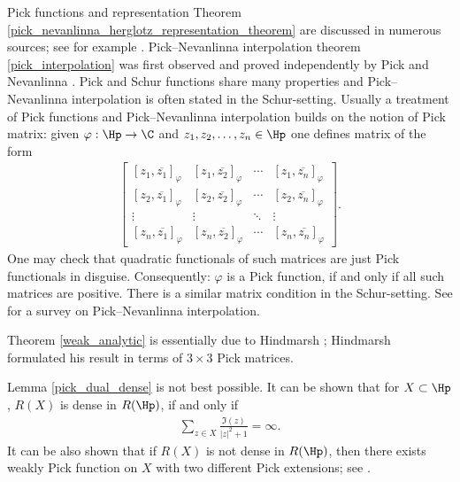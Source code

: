 Pick functions and representation Theorem \ref{pick_nevanlinna_herglotz_representation_theorem} are discussed in numerous sources; see for example \cite{Don}. Pick--Nevanlinna interpolation theorem \ref{pick_interpolation} was first observed and proved independently by Pick \cite{Pick} and Nevanlinna \cite{Nevan}. Pick and Schur functions share many properties and Pick--Nevanlinna interpolation is often stated in the Schur-setting. Usually a treatment of Pick functions and Pick--Nevanlinna interpolation builds on the notion of Pick matrix: given $\varphi : \Hp \to \C$ and $z_{1}, z_{2}, \ldots, z_{n} \in \Hp$ one defines matrix of the form
\begin{align*}
	\begin{bmatrix}
		[z_{1}, \overline{z_{1}}]_{\varphi} & [z_{1}, \overline{z_{2}}]_{\varphi} & \cdots & [z_{1}, \overline{z_{n}}]_{\varphi} \\
		[z_{2}, \overline{z_{1}}]_{\varphi} & [z_{2}, \overline{z_{2}}]_{\varphi} & \cdots & [z_{2}, \overline{z_{n}}]_{\varphi} \\
		\vdots & \vdots & \ddots & \vdots \\
		[z_{n}, \overline{z_{1}}]_{\varphi} & [z_{n}, \overline{z_{2}}]_{\varphi} & \cdots &  [z_{n}, \overline{z_{n}}]_{\varphi}
	\end{bmatrix}.
\end{align*}
One may check that quadratic functionals of such matrices are just Pick functionals in disguise. Consequently: $\varphi$ is a Pick function, if and only if all such matrices are positive. There is a similar matrix condition in the Schur-setting. See \cite{Nicol} for a survey on Pick--Nevanlinna interpolation.

Theorem \ref{weak_analytic} is essentially due to Hindmarsh \cite{Hind}; Hindmarsh formulated his result in terms of $3 \times 3$ Pick matrices.

Lemma \ref{pick_dual_dense} is not best possible. It can be shown that for $X \subset \Hp$, $R(X)$ is dense in $R(\Hp)$, if and only if
\begin{align*}
	\sum_{z \in X} \frac{\Im(z)}{|z|^2 + 1} = \infty.
\end{align*}
It can be also shown that if $R(X)$ is not dense in $R(\Hp)$, then there exists weakly Pick function on $X$ with two different Pick extensions; see \cite{Walsh}.
\begin{comment}

TODO:
\begin{itemize}
	\item Examples of representing measures behind functions and functions behind representing measures
	\item Spectral commutant lifting theorem
	\item Use Morera's theorem to prove weak Hindmarsh's theorem
	\item Nice formula for finite Pick extension (rational function case)
\end{itemize}

\end{comment}






